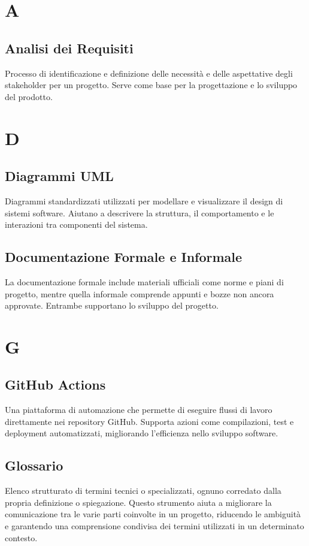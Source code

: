\documentclass{article}
\begin{document}
\section{A}

\subsection{Analisi dei Requisiti}
Processo di identificazione e definizione delle necessità e delle aspettative degli stakeholder per un progetto. Serve come base per la progettazione e lo sviluppo del prodotto.

\newpage

\section{D}

\subsection{Diagrammi UML}
Diagrammi standardizzati utilizzati per modellare e visualizzare il design di sistemi software. Aiutano a descrivere la struttura, il comportamento e le interazioni tra componenti del sistema.

\subsection{Documentazione Formale e Informale}
La documentazione formale include materiali ufficiali come norme e piani di progetto, mentre quella informale comprende appunti e bozze non ancora approvate. Entrambe supportano lo sviluppo del progetto.

\newpage

\section{G}

\subsection{GitHub Actions}
Una piattaforma di automazione che permette di eseguire flussi di lavoro direttamente nei repository GitHub. Supporta azioni come compilazioni, test e deployment automatizzati, migliorando l'efficienza nello sviluppo software.

\subsection{Glossario}
Elenco strutturato di termini tecnici o specializzati, ognuno corredato dalla propria definizione o spiegazione. Questo strumento aiuta a migliorare la comunicazione tra le varie parti coinvolte in un progetto, riducendo le ambiguità e garantendo una comprensione condivisa dei termini utilizzati in un determinato contesto.
\end{document}
